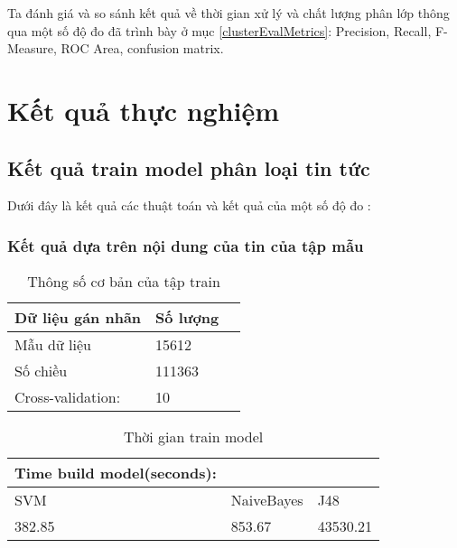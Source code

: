 Ta đánh giá và so sánh kết quả về thời gian xử lý và chất lượng phân lớp thông qua một số độ đo đã trình bày ở mục \ref{clusterEvalMetrics}: Precision, Recall, F-Measure, ROC Area, confusion matrix.

\section{Kết quả thực nghiệm}

	\subsection{Kết quả train model phân loại tin tức}
	Dưới đây là kết quả các thuật toán và kết quả của một số độ đo :
	\subsubsection{Kết quả dựa trên nội dung của tin của tập mẫu}
	\begin{table}[H]
		\centering
		\setlength\extrarowheight{3pt}
		\begin{tabular}{|l|l|l|}
			\hline
			Dữ liệu gán nhãn & Số lượng \\
			\hline
			Mẫu dữ liệu   & 15612\\
			\hline
			Số chiều   & 111363\\
			\hline
			Cross-validation:   & 10\\
			\hline
		\end{tabular}%
		\caption{Thông số cơ bản của tập train} \label{tab:table_4_3}%
	\end{table}
	\begin{table}[H]
		\centering
		\begin{tabular}{|l|l|l|}
			\hline
			Time build model(seconds): &            &          \\
			\hline
			SVM                        & NaiveBayes & J48      \\
			\hline
			382.85                     & 853.67     & 43530.21 \\
			\hline
		\end{tabular}
		\caption{Thời gian train model}
		\label{tab:table_4_4}
	\end{table}
